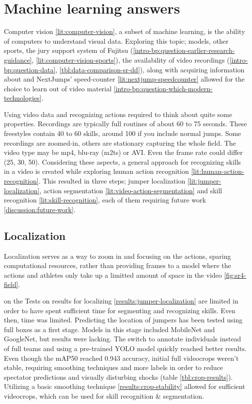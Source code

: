 \section{Machine learning answers}
\label{ch:machine-learning-answers}

Computer vision \ref{lit:computer-vision}, a subset of machine learning, is the ability of computers to understand visual data.
Exploring this topic; models, other sports, the jury support system of Fujitsu (\ref{intro-bp:question-earlier-research-guidance}, \ref{lit:computer-vision-sports}), the availability of video recordings (\ref{intro-bp:question-data}, \ref{tbl:data-comparison-sr-dd}), along with acquiring information about and NextJumps' speed-counter \ref{lit:nextjump-speedcounter} allowed for the choice to learn out of video material \ref{intro-bp:question-which-modern-technologies}.

Using video data and recognizing actions required to think about quite some properties. Recordings are typically full routines of about 60 to 75 seconds. These freestyles contain 40 to 60 skills, around 100 if you include normal jumps. Some recordings are zoomed-in, others are stationary capturing the whole field. The video type may be mp4, blu-ray (m2ts) or AVI. Even the frame rate could differ (25, 30, 50).
Considering these aspects, a general approach for recognizing skills in a video is created while exploring human action recognition \ref{lit:human-action-recognition}. This resulted in three steps; jumper localization \ref{lit:jumper-localization}, action segmentation \ref{lit:video-action-segmentation} and skill recognition \ref{lit:skill-recognition}, each of them requiring future work \ref{discussion:future-work}.


\subsection{Localization}

Localization serves as a way to zoom in and focusing on the actions, sparing computational resources, rather than providing frames to a model where the actions and athletes only take up a limitted amount of space in the video \ref{fig:sr4-field}.

on the  Tests on results for localizing \ref{results:jumper-localization} are limited in order to have spent sufficient time for segmenting and recognizing skills. Even then, time was limited. Predicting the location of jumpers has been tested using full boxes as a first stage. Models in this stage included MobileNet and GoogleNet, but results were lacking. The switch to annotate individuals instead of full teams and using a pre-trained YOLO model quickly reached better results.
Even though the mAP50 reached 0.943 accuracy, initial full videocrops weren't stable, requiring smoothing techniques and more labels in order to reduce spectator predictions and visually disturbing shocks (table \ref{tbl:crop-results}). Utilizing a basic smoothing technique \ref{results:crop-stability} allowed for sufficient videocrops, which can be used for skill recognition \& segmentation.

